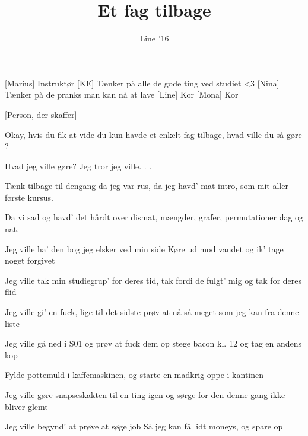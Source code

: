 \documentclass[a4paper,11pt]{article}
\title{Et fag tilbage}
\author{Line ’16}
\begin{document}
\maketitle

\begin{roles}
[Marius] Instruktør
[KE] Tænker på alle de gode ting ved studiet <3
[Nina] Tænker på de pranks man kan nå at lave
[Line] Kor
[Mona] Kor
\end{roles}

\begin{props}
[Person, der skaffer]
\end{props}


\begin{song}


%
Okay, hvis du fik at vide du kun havde et enkelt fag tilbage,
hvad ville du så gøre ?

%
Hvad jeg ville gøre? Jeg tror jeg ville. . .

Tænk tilbage til dengang da jeg var rus,
da jeg havd’ mat-intro, som mit aller første kursus.

Da vi sad og havd’ det hårdt over dismat,
mængder, grafer, permutationer dag og nat.

Jeg ville ha’ den bog jeg elsker ved min side
Køre ud mod vandet og ik’ tage noget forgivet

Jeg ville tak min studiegrup’ for deres tid,
tak fordi de fulgt’ mig og tak for deres flid

%
Jeg ville gi’ en fuck, lige til det sidste
prøv at nå så meget som jeg kan fra denne liste

Jeg ville gå ned i S01 og prøv at fuck dem op
stege bacon kl. 12 og tag en andens kop

Fylde pottemuld i kaffemaskinen,
og starte en madkrig oppe i kantinen

Jeg ville gøre snapseskakten til en ting igen
og sørge for den denne gang ikke bliver glemt

%
Jeg ville begynd’ at prøve at søge job
Så jeg kan få lidt moneys, og spare op


\end{song}
\end{document}
